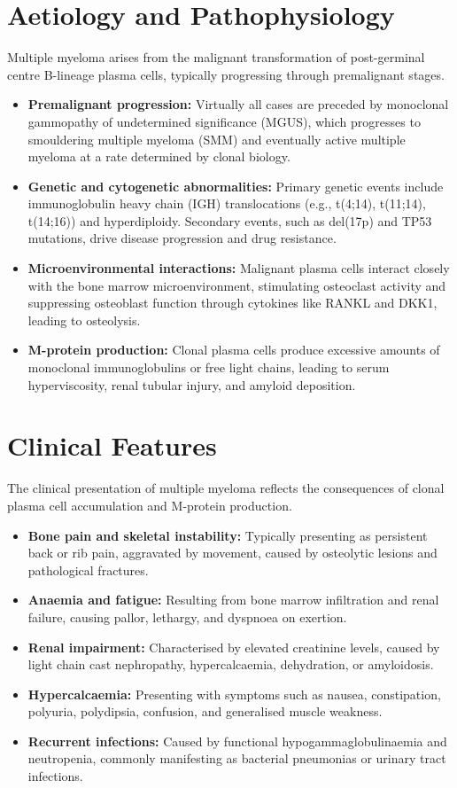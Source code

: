 \section*{Aetiology and Pathophysiology}
Multiple myeloma arises from the malignant transformation of post-germinal centre B-lineage plasma cells, typically progressing through premalignant stages.
\begin{itemize}
    \item \textbf{Premalignant progression:} Virtually all cases are preceded by monoclonal gammopathy of undetermined significance (MGUS), which progresses to smouldering multiple myeloma (SMM) and eventually active multiple myeloma at a rate determined by clonal biology.
    \item \textbf{Genetic and cytogenetic abnormalities:} Primary genetic events include immunoglobulin heavy chain (IGH) translocations (e.g., t(4;14), t(11;14), t(14;16)) and hyperdiploidy. Secondary events, such as del(17p) and TP53 mutations, drive disease progression and drug resistance.
    \item \textbf{Microenvironmental interactions:} Malignant plasma cells interact closely with the bone marrow microenvironment, stimulating osteoclast activity and suppressing osteoblast function through cytokines like RANKL and DKK1, leading to osteolysis.
    \item \textbf{M-protein production:} Clonal plasma cells produce excessive amounts of monoclonal immunoglobulins or free light chains, leading to serum hyperviscosity, renal tubular injury, and amyloid deposition.
\end{itemize}

\section*{Clinical Features}
The clinical presentation of multiple myeloma reflects the consequences of clonal plasma cell accumulation and M-protein production.
\begin{itemize}
    \item \textbf{Bone pain and skeletal instability:} Typically presenting as persistent back or rib pain, aggravated by movement, caused by osteolytic lesions and pathological fractures.
    \item \textbf{Anaemia and fatigue:} Resulting from bone marrow infiltration and renal failure, causing pallor, lethargy, and dyspnoea on exertion.
    \item \textbf{Renal impairment:} Characterised by elevated creatinine levels, caused by light chain cast nephropathy, hypercalcaemia, dehydration, or amyloidosis.
    \item \textbf{Hypercalcaemia:} Presenting with symptoms such as nausea, constipation, polyuria, polydipsia, confusion, and generalised muscle weakness.
    \item \textbf{Recurrent infections:} Caused by functional hypogammaglobulinaemia and neutropenia, commonly manifesting as bacterial pneumonias or urinary tract infections.
\end{itemize}

